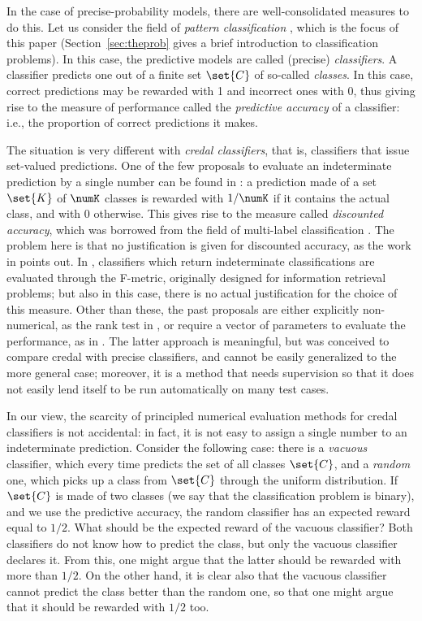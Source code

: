 \documentclass[a4paper,10pt,reqno]{amsart}
\theoremstyle{remark}
\begin{document}
In the case of precise-probability models, there are well-consolidated measures to do this. Let us consider the field of \emph{pattern classification} \cite{duda2001}, which is the focus of this paper (Section~\ref{sec:theprob} gives a brief introduction to classification problems). In this case, the predictive models are called (precise) \emph{classifiers}. A classifier predicts one out of a finite set $\set{C}$ of so-called \emph{classes}. In this case, correct predictions may be rewarded with 1 and incorrect ones with 0, thus giving rise to the measure of performance called the \emph{predictive accuracy} of a classifier: i.e., the proportion of correct predictions it makes.

The situation is very different with \emph{credal classifiers}, that is, classifiers that issue set-valued predictions. One of the few proposals to evaluate an indeterminate prediction by a single number can be found in \cite{corani2009b}: a prediction made of a set $\set{K}$ of $\numK$ classes is rewarded with $1/\numK$ if it contains the actual class, and with 0 otherwise. This gives rise to the measure called \emph{discounted accuracy}, which was borrowed from the field of multi-label classification \cite{tsoumakas2007rkl}.  The problem here is that no justification is given for discounted accuracy, as the work in \cite{corani2009b} points out. In \cite{JdalCozlearning}, classifiers which return indeterminate classifications are evaluated through the F-metric, originally designed for information retrieval problems; but also in this case, there is no actual justification for the choice of this measure. Other than these, the past proposals are either explicitly non-numerical, as the rank test in \cite{corani2009b}, or require a vector of parameters to evaluate the performance, as in \cite{corani2008a}. The latter approach is meaningful, but was conceived to compare credal with precise classifiers, and cannot be easily generalized to the more general case; moreover, it is a method that needs supervision so that it does not easily lend itself to be run automatically on many test cases.

In our view, the scarcity of principled numerical evaluation methods for credal classifiers is not accidental: in fact, it is not easy to assign a single number to an indeterminate prediction. Consider the following case: there is a \emph{vacuous} classifier, which every time predicts the set of all classes $\set{C}$, and a \emph{random} one, which picks up a class from $\set{C}$ through the uniform distribution. If $\set{C}$ is made of two classes (we say that the classification problem is binary), and we use the predictive accuracy, the random classifier has an expected reward equal to $1/2$. What should be the expected reward of the vacuous classifier? Both classifiers do not know how to predict the class, but only the vacuous classifier declares it. From this, one might argue that the latter should be rewarded with more than $1/2$. On the other hand, it is clear also that the vacuous classifier cannot predict the class better than the random one, so that one might argue that it should be rewarded with $1/2$ too.
\end{document}
